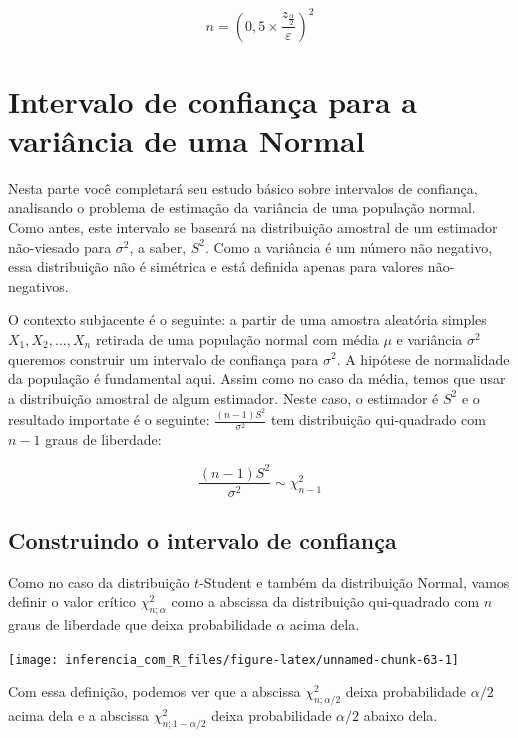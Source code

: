 \documentclass[
]{book}
\begin{document}
\[n=\left(0,5\times \frac{z_{\frac{\alpha}{2}}}{\varepsilon}\right)^2\]

\hypertarget{intervalo-de-confianuxe7a-para-a-variuxe2ncia-de-uma-normal}{%
\section{Intervalo de confiança para a variância de uma Normal}\label{intervalo-de-confianuxe7a-para-a-variuxe2ncia-de-uma-normal}}

Nesta parte você completará seu estudo básico sobre intervalos de confiança, analisando o problema de estimação da variância de uma população normal. Como antes, este intervalo se baseará na distribuição amostral de um estimador não-viesado para \(\sigma^2\), a saber, \(S^2\). Como a variância é um número não negativo, essa distribuição não é simétrica e está definida apenas para valores não-negativos.

O contexto subjacente é o seguinte: a partir de uma amostra aleatória simples \(X_1,X_2,\ldots,X_n\) retirada de uma população normal com média \(\mu\) e variância \(\sigma^2\) queremos construir um intervalo de confiança para \(\sigma^2\). A hipótese de normalidade da população é fundamental aqui. Assim como no caso da média, temos que usar a distribuição amostral de algum estimador. Neste caso, o estimador é \(S^2\) e o resultado importate é o seguinte: \(\frac{(n-1)S^2}{\sigma^2}\) tem distribuição qui-quadrado com \(n-1\) graus de liberdade:

\[\frac{(n-1)S^2}{\sigma^2}\sim\chi^2_{n-1}\]

\hypertarget{construindo-o-intervalo-de-confianuxe7a-3}{%
\subsection{Construindo o intervalo de confiança}\label{construindo-o-intervalo-de-confianuxe7a-3}}

Como no caso da distribuição \(t\)-Student e também da distribuição Normal, vamos definir o valor crítico \(\chi^2_{n;\alpha}\) como a abscissa da distribuição qui-quadrado com \(n\) graus de liberdade que deixa probabilidade \(\alpha\) acima dela.

\begin{center}\texttt{[image: inferencia\_com\_R\_files/figure-latex/unnamed-chunk-63-1]} \end{center}

Com essa definição, podemos ver que a abscissa \(\chi^2_{n;\alpha/2}\) deixa probabilidade \(\alpha/2\) acima dela e a abscissa \(\chi^2_{n;1-\alpha/2}\) deixa probabilidade \(\alpha/2\) abaixo dela.
\end{document}
